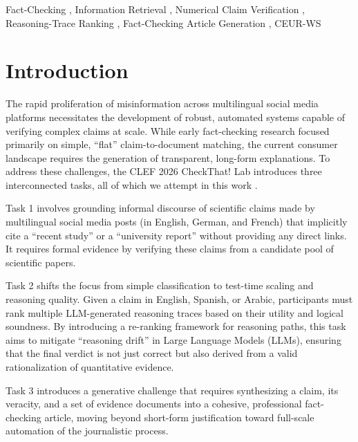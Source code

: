 \documentclass[
]{ceurart}
\begin{document}
%
\begin{keywords}
  Fact-Checking \sep
  Information Retrieval \sep
  Numerical Claim Verification \sep
  Reasoning-Trace Ranking \sep
  Fact-Checking Article Generation \sep
  CEUR-WS
\end{keywords}

\maketitle

\section{Introduction}
The rapid proliferation of misinformation across multilingual social media platforms necessitates the development of robust, automated systems capable of verifying complex claims at scale. While early fact-checking research focused primarily on simple, ``flat'' claim-to-document matching, the current consumer landscape requires the generation of transparent, long-form explanations. To address these challenges, the CLEF 2026 CheckThat! Lab introduces three interconnected tasks, all of which we attempt in this work \cite{10.1007/978-3-032-21321-1_43}.

Task 1 involves grounding informal discourse of scientific claims made by multilingual social media posts (in English, German, and French) that implicitly cite a ``recent study'' or a ``university report'' without providing any direct links. It requires formal evidence by verifying these claims from a candidate pool of scientific papers. 

Task 2 shifts the focus from simple classification to test-time scaling and reasoning quality. Given a claim in English, Spanish, or Arabic, participants must rank multiple LLM-generated reasoning traces based on their utility and logical soundness. By introducing a re-ranking framework for reasoning paths, this task aims to mitigate ``reasoning drift'' in Large Language Models (LLMs), ensuring that the final verdict is not just correct but also derived from a valid rationalization of quantitative evidence.

Task 3 introduces a generative challenge that requires synthesizing a claim, its veracity, and a set of evidence documents into a cohesive, professional fact-checking article, moving beyond short-form justification toward full-scale automation of the journalistic process.
\end{document}
